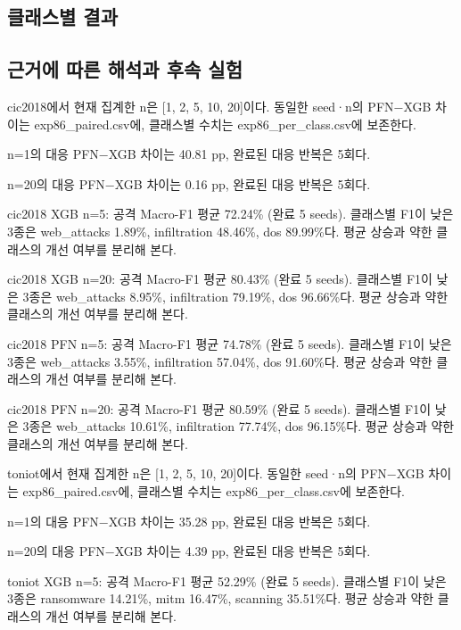 \subsection{클래스별 결과}


\subsection{근거에 따른 해석과 후속 실험}
cic2018에서 현재 집계한 n은 [1, 2, 5, 10, 20]이다. 동일한 seed·n의 PFN−XGB 차이는 exp86\_\allowbreak{}paired.csv에, 클래스별 수치는 exp86\_\allowbreak{}per\_\allowbreak{}class.csv에 보존한다.

n=\allowbreak{}1의 대응 PFN−XGB 차이는 40.81 pp, 완료된 대응 반복은 5회다.

n=\allowbreak{}20의 대응 PFN−XGB 차이는 0.16 pp, 완료된 대응 반복은 5회다.

cic2018 XGB n=\allowbreak{}5: 공격 Macro-F1 평균 72.24\% (완료 5 seeds). 클래스별 F1이 낮은 3종은 web\_\allowbreak{}attacks 1.89\%, infiltration 48.46\%, dos 89.99\%다. 평균 상승과 약한 클래스의 개선 여부를 분리해 본다.

cic2018 XGB n=\allowbreak{}20: 공격 Macro-F1 평균 80.43\% (완료 5 seeds). 클래스별 F1이 낮은 3종은 web\_\allowbreak{}attacks 8.95\%, infiltration 79.19\%, dos 96.66\%다. 평균 상승과 약한 클래스의 개선 여부를 분리해 본다.

cic2018 PFN n=\allowbreak{}5: 공격 Macro-F1 평균 74.78\% (완료 5 seeds). 클래스별 F1이 낮은 3종은 web\_\allowbreak{}attacks 3.55\%, infiltration 57.04\%, dos 91.60\%다. 평균 상승과 약한 클래스의 개선 여부를 분리해 본다.

cic2018 PFN n=\allowbreak{}20: 공격 Macro-F1 평균 80.59\% (완료 5 seeds). 클래스별 F1이 낮은 3종은 web\_\allowbreak{}attacks 10.61\%, infiltration 77.74\%, dos 96.15\%다. 평균 상승과 약한 클래스의 개선 여부를 분리해 본다.

toniot에서 현재 집계한 n은 [1, 2, 5, 10, 20]이다. 동일한 seed·n의 PFN−XGB 차이는 exp86\_\allowbreak{}paired.csv에, 클래스별 수치는 exp86\_\allowbreak{}per\_\allowbreak{}class.csv에 보존한다.

n=\allowbreak{}1의 대응 PFN−XGB 차이는 35.28 pp, 완료된 대응 반복은 5회다.

n=\allowbreak{}20의 대응 PFN−XGB 차이는 4.39 pp, 완료된 대응 반복은 5회다.

toniot XGB n=\allowbreak{}5: 공격 Macro-F1 평균 52.29\% (완료 5 seeds). 클래스별 F1이 낮은 3종은 ransomware 14.21\%, mitm 16.47\%, scanning 35.51\%다. 평균 상승과 약한 클래스의 개선 여부를 분리해 본다.

